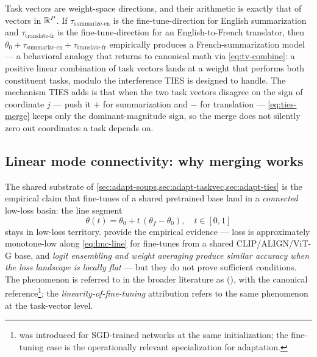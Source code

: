 \begin{intuition}
Task vectors are weight-space directions, and their arithmetic is
exactly that of vectors in $\mathbb{R}^P$. If $\tau_{\text{summarize-en}}$ is
the fine-tune-direction for English summarization and
$\tau_{\text{translate-fr}}$ is the fine-tune-direction for an
English-to-French translator, then
$\theta_0 + \tau_{\text{summarize-en}} + \tau_{\text{translate-fr}}$
empirically produces a French-summarization model
\citep[\S 3]{ilharco2022-task-vectors} — a behavioral analogy that
returns to canonical math via \cref{eq:tv-combine}: a positive linear
combination of task vectors lands at a weight that performs both
constituent tasks, modulo the interference TIES is designed to handle.
The mechanism TIES adds is that when the two task vectors disagree on
the sign of coordinate $j$ — push it $+$ for summarization and $-$ for
translation — \cref{eq:ties-merge} keeps only the dominant-magnitude
sign, so the merge does not silently zero out coordinates
a task depends on.
\end{intuition}

\subsection{Linear mode connectivity: why merging works}
\label{sec:adapt-lmc}

The shared substrate of \cref{sec:adapt-soups,sec:adapt-taskvec,sec:adapt-ties}
is the empirical claim that fine-tunes of a shared pretrained base land
in a \emph{connected} low-loss basin: the line segment
\begin{equation}
\theta(t) = \theta_0 + t\, (\theta_f - \theta_0),
\quad t \in [0, 1]
\label{eq:lmc-line}
\end{equation}
stays in low-loss territory. \citet[\S 3]{wortsman2022-model-soups}
provide the empirical evidence — loss is approximately monotone-low
along \cref{eq:lmc-line} for fine-tunes from a shared CLIP/ALIGN/ViT-G
base, and \emph{logit ensembling and weight averaging produce similar
accuracy when the loss landscape is locally flat}
\citep[\S 4]{wortsman2022-model-soups} — but they do not prove sufficient
conditions. The phenomenon is referred to in the broader literature as
\emph{} (), with \citet{frankle2020-lmc} the canonical reference\footnote{ was introduced for SGD-trained
networks at the same initialization; the fine-tuning case is the
operationally relevant specialization for adaptation.}; the
\citet[\S 4]{ilharco2022-task-vectors} \emph{linearity-of-fine-tuning}
attribution refers to the same phenomenon at the task-vector level.

